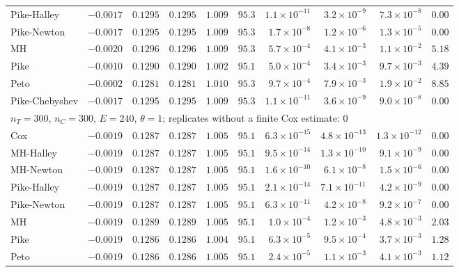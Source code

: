 \begin{landscape}
\begin{longtable}{lrrrrrrrrr}
Pike-Halley & $-0.0017$ & $0.1295$ & $0.1295$ & $1.009$ & $95.3$ & $1.1 \times 10^{-11}$ & $3.2 \times 10^{-9}$ & $7.3 \times 10^{-8}$ & $0.00$ \\
Pike-Newton & $-0.0017$ & $0.1295$ & $0.1295$ & $1.009$ & $95.3$ & $1.7 \times 10^{-8}$ & $1.2 \times 10^{-6}$ & $1.3 \times 10^{-5}$ & $0.00$ \\
MH & $-0.0020$ & $0.1296$ & $0.1296$ & $1.009$ & $95.3$ & $5.7 \times 10^{-4}$ & $4.1 \times 10^{-3}$ & $1.1 \times 10^{-2}$ & $5.18$ \\
Pike & $-0.0010$ & $0.1290$ & $0.1290$ & $1.002$ & $95.1$ & $5.0 \times 10^{-4}$ & $3.4 \times 10^{-3}$ & $9.7 \times 10^{-3}$ & $4.39$ \\
Peto & $-0.0002$ & $0.1281$ & $0.1281$ & $1.010$ & $95.3$ & $9.7 \times 10^{-4}$ & $7.9 \times 10^{-3}$ & $1.9 \times 10^{-2}$ & $8.85$ \\
Pike-Chebyshev & $-0.0017$ & $0.1295$ & $0.1295$ & $1.009$ & $95.3$ & $1.1 \times 10^{-11}$ & $3.6 \times 10^{-9}$ & $9.0 \times 10^{-8}$ & $0.00$ \\
\multicolumn{10}{l}{$n_T = 300$, $n_C = 300$, $E = 240$, $\theta = 1$; replicates without a finite Cox estimate: 0} \\
Cox & $-0.0019$ & $0.1287$ & $0.1287$ & $1.005$ & $95.1$ & $6.3 \times 10^{-15}$ & $4.8 \times 10^{-13}$ & $1.3 \times 10^{-12}$ & $0.00$ \\
MH-Halley & $-0.0019$ & $0.1287$ & $0.1287$ & $1.005$ & $95.1$ & $9.5 \times 10^{-14}$ & $1.3 \times 10^{-10}$ & $9.1 \times 10^{-9}$ & $0.00$ \\
MH-Newton & $-0.0019$ & $0.1287$ & $0.1287$ & $1.005$ & $95.1$ & $1.6 \times 10^{-10}$ & $6.1 \times 10^{-8}$ & $1.5 \times 10^{-6}$ & $0.00$ \\
Pike-Halley & $-0.0019$ & $0.1287$ & $0.1287$ & $1.005$ & $95.1$ & $2.1 \times 10^{-14}$ & $7.1 \times 10^{-11}$ & $4.2 \times 10^{-9}$ & $0.00$ \\
Pike-Newton & $-0.0019$ & $0.1287$ & $0.1287$ & $1.005$ & $95.1$ & $6.3 \times 10^{-11}$ & $4.2 \times 10^{-8}$ & $9.2 \times 10^{-7}$ & $0.00$ \\
MH & $-0.0019$ & $0.1289$ & $0.1289$ & $1.005$ & $95.1$ & $1.0 \times 10^{-4}$ & $1.2 \times 10^{-3}$ & $4.8 \times 10^{-3}$ & $2.03$ \\
Pike & $-0.0019$ & $0.1286$ & $0.1286$ & $1.004$ & $95.1$ & $6.3 \times 10^{-5}$ & $9.5 \times 10^{-4}$ & $3.7 \times 10^{-3}$ & $1.28$ \\
Peto & $-0.0019$ & $0.1286$ & $0.1286$ & $1.005$ & $95.1$ & $2.4 \times 10^{-5}$ & $1.1 \times 10^{-3}$ & $4.1 \times 10^{-3}$ & $1.12$ \\

\end{longtable}
\end{landscape}
